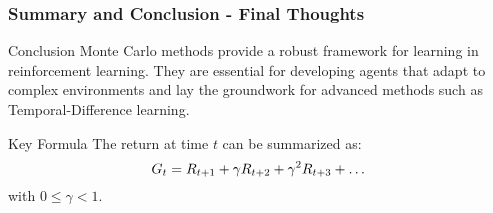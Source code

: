 \documentclass[aspectratio=169]{beamer}
\begin{document}
\begin{frame}[fragile]
    \frametitle{Summary and Conclusion - Final Thoughts}
    \begin{block}{Conclusion}
        Monte Carlo methods provide a robust framework for learning in reinforcement learning. They are essential for developing agents that adapt to complex environments and lay the groundwork for advanced methods such as Temporal-Difference learning.
    \end{block}
    
    \begin{block}{Key Formula}
        The return at time \( t \) can be summarized as:
        \begin{equation}
            G_t = R_{t+1} + \gamma R_{t+2} + \gamma^2 R_{t+3} + \ldots \\
        \end{equation}
        with \( 0 \leq \gamma < 1 \).
    \end{block}
\end{frame}
\end{document}
